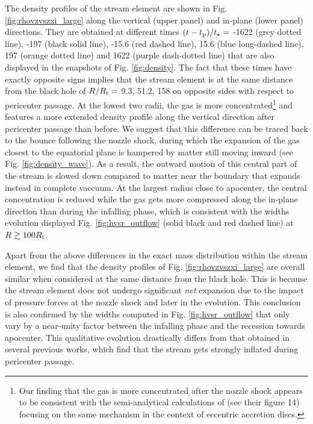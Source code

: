 \documentclass[a4paper,fleqn,usenatbib]{mnras}
\newcommand{\rt}{R_{\rm t}}
\newcommand{\tp}{t_{\rm p}}
\newcommand{\tstar}{t_{\star}}
\begin{document}
The density profiles of the stream element are shown in Fig. \ref{fig:rhovzvszxi_large} along the vertical (upper panel) and in-plane (lower panel) directions. They are obtained at different times $(t - \tp)/\tstar = $ -1622 (grey dotted line), -197 (black solid line), -15.6 (red dashed line), 15.6 (blue long-dashed line), 197 (orange dotted line) and 1622 (purple dash-dotted line) that are also displayed in the snapshots of Fig. \ref{fig:density}. The fact that these times have exactly opposite signs implies that the stream element is at the same  distance from the black hole of $R/\rt = $ 9.3, 51.2, 158 on opposite sides with respect to pericenter passage. At the lowest two radii, the gas is more concentrated\footnote{Our finding that the gas is more concentrated after the nozzle shock appears to be consistent with the semi-analytical calculations of \citet{lynch2021} (see their figure 14) focusing on the same mechanism in the context of eccentric accretion discs.} and features a more extended density profile along the vertical direction after pericenter passage than before. We suggest that this difference can be traced back to the bounce following the nozzle shock, during which the expansion of the gas closest to the equatorial plane is hampered by matter still moving inward (see Fig. \ref{fig:density_wave}). As a result, the outward motion of this central part of the stream is slowed down compared to matter near the boundary that expands instead in complete vaccuum. At the largest radius close to apocenter, the central concentration is reduced while the gas gets more compressed along the in-plane direction than during the infalling phase, which is consistent with the widths evolution displayed Fig. \ref{fig:hvsr_outflow} (solid black and red dashed line) at $R\gtrsim 100 \rt$.



Apart from the above differences in the exact mass distribution within the stream element, we find that the density profiles of Fig. \ref{fig:rhovzvszxi_large} are overall similar when considered at the same distance from the black hole. This is because the stream element does not undergo significant \textit{net} expansion due to the impact of pressure forces at the nozzle shock and later in the evolution. This conclusion is also confirmed by the widths computed in Fig. \ref{fig:hvsr_outflow} that only vary by a near-unity factor between the infalling phase and the recession towards apocenter. This qualitative evolution drastically differs from that obtained in several previous works, which find that the stream gets strongly inflated during pericenter passage.
\end{document}
